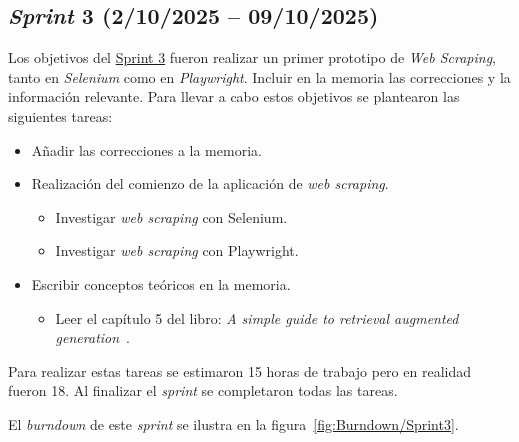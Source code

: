 \subsection{\textit{Sprint} 3 (2/10/2025 -- 09/10/2025)}
Los objetivos del \href{https://github.com/lbr1014/TFG_RAG/milestone/3?closed=1}{Sprint 3} fueron realizar un primer prototipo de \textit{Web Scraping}, tanto en \textit{Selenium} como en \textit{Playwright}. Incluir en la memoria las correcciones y la información relevante.
Para llevar a cabo estos objetivos se plantearon las siguientes tareas:
\begin{itemize}
\tightlist
	\item Añadir las correcciones a la memoria.
	\item Realización del comienzo de la aplicación de \textit{web scraping}.
	\begin{itemize}
	\tightlist
		\item Investigar \textit{web scraping} con Selenium.
		\item Investigar \textit{web scraping} con Playwright.
	\end{itemize}
	\item Escribir conceptos teóricos en la memoria.
	\begin{itemize}
	\tightlist
		\item Leer el capítulo 5 del libro: \textit{A simple guide to retrieval augmented generation}~\cite{book:RAG_SimpleGuide}.
	\end{itemize}
\end{itemize}

Para realizar estas tareas se estimaron 15 horas de trabajo pero en realidad fueron 18. Al finalizar el \textit{sprint} se completaron todas las tareas.

El \textit{burndown} de este \textit{sprint} se ilustra en la figura~\ref{fig:Burndown/Sprint3}.

